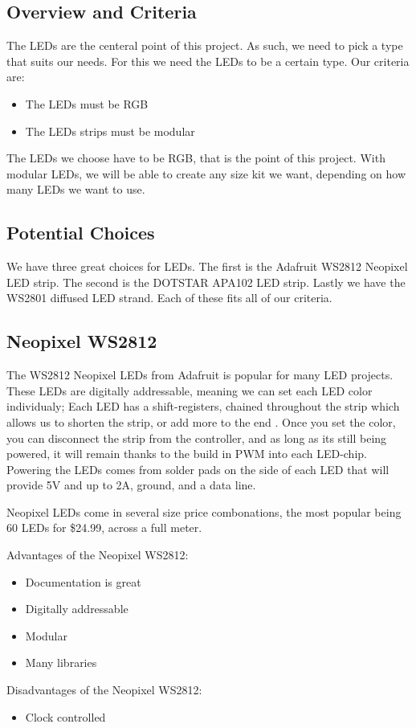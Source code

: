 \documentclass[onecolumn, draftclsnofoot,10pt, compsoc]{IEEEtran}
\begin{document}
		\subsection{Overview and Criteria}
		\noindent The LEDs are the centeral point of this project. As such, we need
		to pick a type that suits our needs. For this we need the LEDs to be a
		certain type. Our criteria are:
		\begin{itemize}
			\item The LEDs must be RGB
			\item The LEDs strips must be modular
		\end{itemize}
		\noindent The LEDs we choose have to be RGB, that is the point of this
		project. With modular LEDs, we will be able to create any size kit we want,
		depending on how many LEDs we want to use.
		\subsection{Potential Choices}
		\noindent We have three great choices for LEDs. The first is the Adafruit
		WS2812 Neopixel LED strip. The second is the DOTSTAR APA102 LED strip.
		Lastly we have the WS2801 diffused LED strand. Each of these fits all of
		our criteria.
		\subsection{Neopixel WS2812}
		\noindent The WS2812 Neopixel LEDs from Adafruit is popular for many LED
		projects. These LEDs are digitally addressable, meaning we can set each LED
		color individualy; Each LED has a shift-registers, chained throughout the
		strip which allows us to shorten the strip, or add more to the end
		\cite[Pg 7]{neo}. Once you set the color, you can disconnect the strip from
		the controller, and as long as its still being powered, it will remain
		thanks to the build in PWM into each LED-chip. Powering the LEDs comes
		from solder pads on the side of each LED that will provide 5V and up to 2A,
		ground, and a data line.


		\vspace{5mm}
		\noindent Neopixel LEDs come in several size price combonations, the most
		popular being 60 LEDs for \$24.99, across a full meter.

		\vspace{5mm}
		\noindent Advantages of the Neopixel WS2812:
		\begin{itemize}
			\item Documentation is great
			\item Digitally addressable
			\item Modular
			\item Many libraries
		\end{itemize}
		Disadvantages of the Neopixel WS2812:
		\begin{itemize}
			\item Clock controlled
		\end{itemize}
\end{document}
